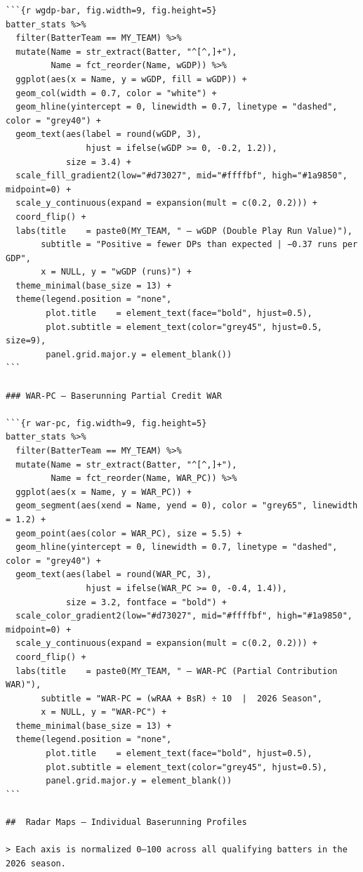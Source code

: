 \documentclass[
]{article}
\begin{document}
\begin{verbatim}
```{r wgdp-bar, fig.width=9, fig.height=5}
batter_stats %>%
  filter(BatterTeam == MY_TEAM) %>%
  mutate(Name = str_extract(Batter, "^[^,]+"),
         Name = fct_reorder(Name, wGDP)) %>%
  ggplot(aes(x = Name, y = wGDP, fill = wGDP)) +
  geom_col(width = 0.7, color = "white") +
  geom_hline(yintercept = 0, linewidth = 0.7, linetype = "dashed", color = "grey40") +
  geom_text(aes(label = round(wGDP, 3),
                hjust = ifelse(wGDP >= 0, -0.2, 1.2)),
            size = 3.4) +
  scale_fill_gradient2(low="#d73027", mid="#ffffbf", high="#1a9850", midpoint=0) +
  scale_y_continuous(expand = expansion(mult = c(0.2, 0.2))) +
  coord_flip() +
  labs(title    = paste0(MY_TEAM, " — wGDP (Double Play Run Value)"),
       subtitle = "Positive = fewer DPs than expected | −0.37 runs per GDP",
       x = NULL, y = "wGDP (runs)") +
  theme_minimal(base_size = 13) +
  theme(legend.position = "none",
        plot.title    = element_text(face="bold", hjust=0.5),
        plot.subtitle = element_text(color="grey45", hjust=0.5, size=9),
        panel.grid.major.y = element_blank())
```

### WAR-PC — Baserunning Partial Credit WAR

```{r war-pc, fig.width=9, fig.height=5}
batter_stats %>%
  filter(BatterTeam == MY_TEAM) %>%
  mutate(Name = str_extract(Batter, "^[^,]+"),
         Name = fct_reorder(Name, WAR_PC)) %>%
  ggplot(aes(x = Name, y = WAR_PC)) +
  geom_segment(aes(xend = Name, yend = 0), color = "grey65", linewidth = 1.2) +
  geom_point(aes(color = WAR_PC), size = 5.5) +
  geom_hline(yintercept = 0, linewidth = 0.7, linetype = "dashed", color = "grey40") +
  geom_text(aes(label = round(WAR_PC, 3),
                hjust = ifelse(WAR_PC >= 0, -0.4, 1.4)),
            size = 3.2, fontface = "bold") +
  scale_color_gradient2(low="#d73027", mid="#ffffbf", high="#1a9850", midpoint=0) +
  scale_y_continuous(expand = expansion(mult = c(0.2, 0.2))) +
  coord_flip() +
  labs(title    = paste0(MY_TEAM, " — WAR-PC (Partial Contribution WAR)"),
       subtitle = "WAR-PC = (wRAA + BsR) ÷ 10  |  2026 Season",
       x = NULL, y = "WAR-PC") +
  theme_minimal(base_size = 13) +
  theme(legend.position = "none",
        plot.title    = element_text(face="bold", hjust=0.5),
        plot.subtitle = element_text(color="grey45", hjust=0.5),
        panel.grid.major.y = element_blank())
```

##  Radar Maps — Individual Baserunning Profiles

> Each axis is normalized 0–100 across all qualifying batters in the 2026 season.


\end{verbatim}
\end{document}
